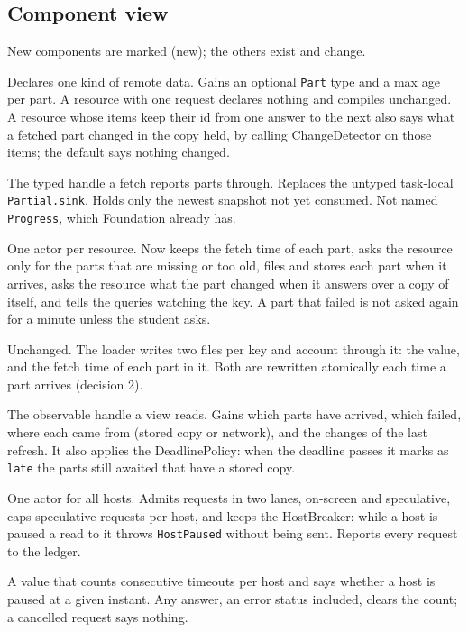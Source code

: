 \subsection{Component view}
New components are marked (new); the others exist and change.

\begin{description}[style=nextline, leftmargin=1.5em]
  \item[Resource] Declares one kind of remote data. Gains an optional \texttt{Part} type and a max age per part. A resource with one request declares nothing and compiles unchanged. A resource whose items keep their id from one answer to the next also says what a fetched part changed in the copy held, by calling ChangeDetector on those items; the default says nothing changed.
  \item[LoadProgress (new)] The typed handle a fetch reports parts through. Replaces the untyped task-local \texttt{Partial.sink}. Holds only the newest snapshot not yet consumed. Not named \texttt{Progress}, which Foundation already has.
  \item[Loader] One actor per resource. Now keeps the fetch time of each part, asks the resource only for the parts that are missing or too old, files and stores each part when it arrives, asks the resource what the part changed when it answers over a copy of itself, and tells the queries watching the key. A part that failed is not asked again for a minute unless the student asks.
  \item[OfflineStore] Unchanged. The loader writes two files per key and account through it: the value, and the fetch time of each part in it. Both are rewritten atomically each time a part arrives (decision 2).
  \item[Query] The observable handle a view reads. Gains which parts have arrived, which failed, where each came from (stored copy or network), and the changes of the last refresh. It also applies the DeadlinePolicy: when the deadline passes it marks as \texttt{late} the parts still awaited that have a stored copy.
  \item[RequestGate (new)] One actor for all hosts. Admits requests in two lanes, on-screen and speculative, caps speculative requests per host, and keeps the HostBreaker: while a host is paused a read to it throws \texttt{HostPaused} without being sent. Reports every request to the ledger.
  \item[HostBreaker (new)] A value that counts consecutive timeouts per host and says whether a host is paused at a given instant. Any answer, an error status included, clears the count; a cancelled request says nothing.

\end{description}
